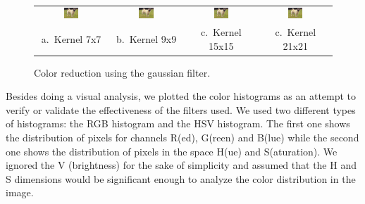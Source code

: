 \documentclass[]{IEEEtran}
\begin{document}
\begin{figure}[t]
  \centering
  \begin{tabular}{c c c c}
  \includegraphics[width=0.22\textwidth]{./figures/3/dog-3-1-1-gaussian7.jpg} &
  \includegraphics[width=0.22\textwidth]{./figures/3/dog-3-1-1-gaussian9.jpg} &
  \includegraphics[width=0.22\textwidth]{./figures/3/dog-3-1-1-gaussian15.jpg} &
  \includegraphics[width=0.22\textwidth]{./figures/3/dog-3-1-1-gaussian21.jpg} \\
  a.~Kernel 7x7 & b.~Kernel 9x9 & c.~Kernel 15x15 & c.~Kernel 21x21
  \end{tabular}
  \caption{Color reduction using the gaussian filter.}
  \label{figure:color-reduction-gaussian}
\end{figure}

  Besides doing a visual analysis, we plotted the color histograms as an attempt to verify or validate
  the effectiveness of the filters used. We used two different types of histograms:
  the RGB histogram and the HSV histogram. The first one shows the distribution of pixels for channels
  R(ed), G(reen) and B(lue) while the second one shows the distribution of pixels in the space H(ue) and S(aturation).
  We ignored the V (brightness) for the sake of simplicity and assumed that the H and S dimensions would be significant
  enough to analyze the color distribution in the image.
\end{document}
